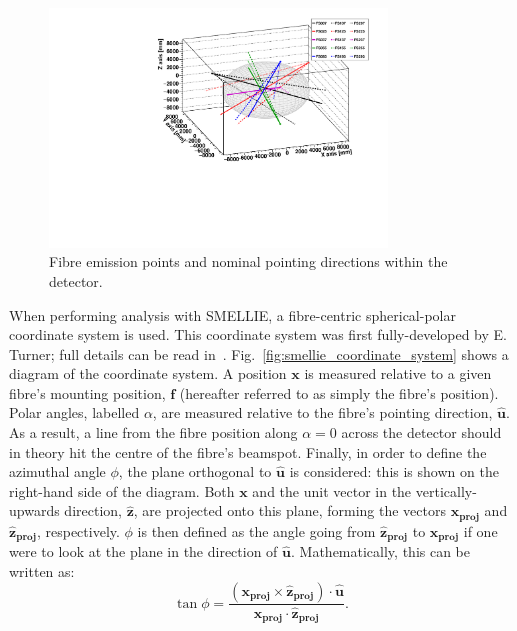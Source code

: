 \begin{figure}
    \centering
    \includegraphics[width=0.8\textwidth]{3_SMELLIEHardware/images/fibre_positions.pdf}
    \caption[Fibre emission points and nominal pointing directions]
    {Fibre emission points and nominal pointing directions within the detector.}
    \label{fig:smellie_pos_dirs}
\end{figure}

When performing analysis with SMELLIE, a fibre-centric spherical-polar coordinate system is used. This coordinate system was first fully-developed by E. Turner; full details can be read in~\cite{turnerMeasurementScatteringCharacteristics2022}. Fig.~\ref{fig:smellie_coordinate_system} shows a diagram of the coordinate system. A position $\bm{x}$ is measured relative to a given fibre's mounting position, $\bm{f}$ (hereafter referred to as simply the fibre's position). Polar angles, labelled $\alpha$, are measured relative to the fibre's pointing direction, $\bm{\hat{u}}$. As a result, a line from the fibre position along $\alpha = 0$ across the detector should in theory hit the centre of the fibre's beamspot. Finally, in order to define the azimuthal angle $\phi$, the plane orthogonal to $\bm{\hat{u}}$ is considered: this is shown on the right-hand side of the diagram. Both $\bm{x}$ and the unit vector in the vertically-upwards direction, $\bm{\hat{z}}$, are projected onto this plane, forming the vectors $\bm{x_{proj}}$ and $\bm{\hat{z}_{proj}}$, respectively. $\phi$ is then defined as the angle going from $\bm{\hat{z}_{proj}}$ to $\bm{x_{proj}}$ if one were to look at the plane in the direction of $\bm{\hat{u}}$. Mathematically, this can be written as:
\begin{equation}
    \tan\phi = \frac{
        \left(\bm{x_{proj}}\times\bm{\hat{z}_{proj}}\right)\cdot\bm{\hat{u}}
        }{\bm{x_{proj}}\cdot\bm{\hat{z}_{proj}}}.
\end{equation}

